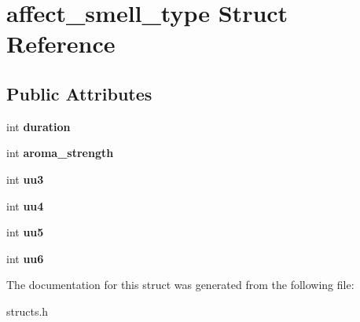 \hypertarget{structaffect__smell__type}{\section{affect\-\_\-smell\-\_\-type Struct Reference}
\label{structaffect__smell__type}
}
\subsection*{Public Attributes}
\begin{DoxyCompactItemize}
\item 
\hypertarget{structaffect__smell__type_a1c7091f7d2291dee192865dc101cd88c}{int {\bfseries duration}}\label{structaffect__smell__type_a1c7091f7d2291dee192865dc101cd88c}

\item 
\hypertarget{structaffect__smell__type_af10dcb912eb0bde53795a3a6c76d16ee}{int {\bfseries aroma\-\_\-strength}}\label{structaffect__smell__type_af10dcb912eb0bde53795a3a6c76d16ee}

\item 
\hypertarget{structaffect__smell__type_a9ef4ccd245472ac823f6e44550fe82ab}{int {\bfseries uu3}}\label{structaffect__smell__type_a9ef4ccd245472ac823f6e44550fe82ab}

\item 
\hypertarget{structaffect__smell__type_afd48276e2c9073fd1cded287224ba095}{int {\bfseries uu4}}\label{structaffect__smell__type_afd48276e2c9073fd1cded287224ba095}

\item 
\hypertarget{structaffect__smell__type_ac7b894d10844d10d447f4350e0304c85}{int {\bfseries uu5}}\label{structaffect__smell__type_ac7b894d10844d10d447f4350e0304c85}

\item 
\hypertarget{structaffect__smell__type_adb1543d2f301fb9532831c9325147edd}{int {\bfseries uu6}}\label{structaffect__smell__type_adb1543d2f301fb9532831c9325147edd}

\end{DoxyCompactItemize}


The documentation for this struct was generated from the following file\-:\begin{DoxyCompactItemize}
\item 
structs.\-h\end{DoxyCompactItemize}
